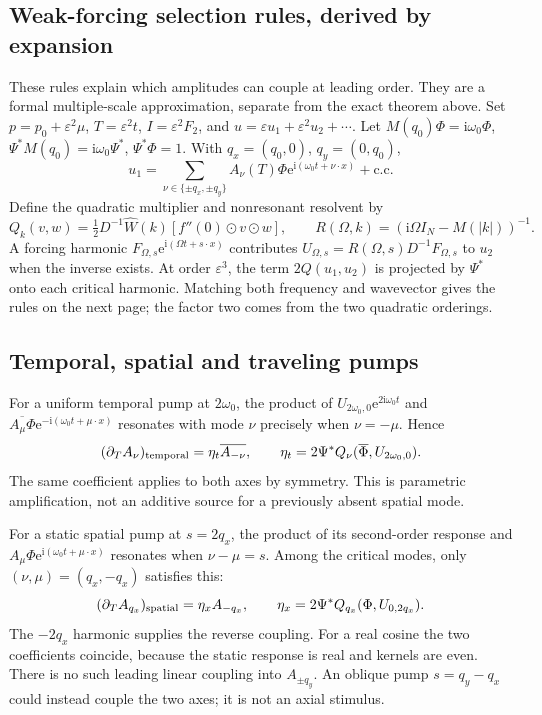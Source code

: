 \documentclass[11pt]{article}
\newcommand{\ee}{\mathrm e}
\newcommand{\ii}{\mathrm i}
\begin{document}
\subsection{Weak-forcing selection rules, derived by expansion}
These rules explain which amplitudes can couple at leading order. They are a
formal multiple-scale approximation, separate from the exact theorem above.
Set $p=p_0+\varepsilon^2\mu$, $T=\varepsilon^2t$,
$I=\varepsilon^2F_2$, and $u=\varepsilon u_1+\varepsilon^2u_2+\cdots$.
Let $M(q_0)\Phi=\ii\omega_0\Phi$, $\Psi^*M(q_0)=\ii\omega_0\Psi^*$,
$\Psi^*\Phi=1$. With $q_x=(q_0,0)$, $q_y=(0,q_0)$,
\begin{equation}
 u_1=\sum_{\nu\in\{\pm q_x,\pm q_y\}}A_\nu(T)\Phi
       \ee^{\ii(\omega_0t+\nu\cdot x)}+\text{c.c.}
 \label{eq:criticalexpansion}
\end{equation}
Define the quadratic multiplier and nonresonant resolvent by
\begin{equation}
 Q_k(v,w)=\tfrac12D^{-1}\widehat W(k)
                  [f''(0)\odot v\odot w],\qquad
 R(\Omega,k)=(\ii\Omega I_N-M(|k|))^{-1}.
\end{equation}
A forcing harmonic $F_{\Omega,s}\ee^{\ii(\Omega t+s\cdot x)}$ contributes
$U_{\Omega,s}=R(\Omega,s)D^{-1}F_{\Omega,s}$ to $u_2$ when the inverse exists.
At order $\varepsilon^3$, the term $2Q(u_1,u_2)$ is projected by $\Psi^*$
onto each critical harmonic. Matching both frequency and wavevector gives the
rules on the next page; the factor two comes from the two quadratic orderings.

\newpage
\subsection{Temporal, spatial and traveling pumps}
For a uniform temporal pump at $2\omega_0$, the product of
$U_{2\omega_0,0}\ee^{2\ii\omega_0t}$ and
$\overline{A_\mu\Phi}\ee^{-\ii(\omega_0t+\mu\cdot x)}$
resonates with mode $\nu$ precisely when $\nu=-\mu$. Hence
\begin{equation}
 (\partial_T A_\nu)_{\rm temporal}
 =\eta_t\overline{A_{-\nu}},\qquad
 \eta_t=2\Psi^*Q_\nu(\overline\Phi,U_{2\omega_0,0}).
 \label{eq:temporalselection}
\end{equation}
The same coefficient applies to both axes by symmetry. This is parametric
amplification, not an additive source for a previously absent spatial mode.

For a static spatial pump at $s=2q_x$, the product of its second-order response
and $A_\mu\Phi\ee^{\ii(\omega_0t+\mu\cdot x)}$ resonates when $\nu-\mu=s$.
Among the critical modes, only $(\nu,\mu)=(q_x,-q_x)$ satisfies this:
\begin{equation}
 (\partial_T A_{q_x})_{\rm spatial}=\eta_x A_{-q_x},\qquad
 \eta_x=2\Psi^*Q_{q_x}(\Phi,U_{0,2q_x}).
 \label{eq:spatialselection}
\end{equation}
The $-2q_x$ harmonic supplies the reverse coupling. For a real cosine the
two coefficients coincide, because the static response is real and kernels
are even. There is no such leading linear coupling into $A_{\pm q_y}$.
An oblique pump $s=q_y-q_x$ could instead couple the two axes; it is not an
axial stimulus.
\end{document}
